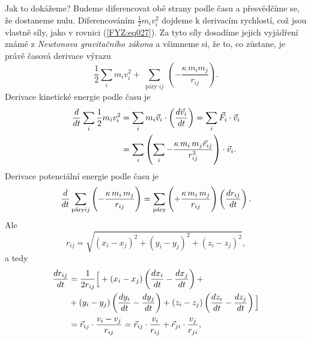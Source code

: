 {    Jak to dokážeme? Budeme diferencovat obě strany podle času a přesvědčíme se, že dostaneme nulu. 
    Diferencováním \(\frac{1}{2}m_iv_i^2\) dojdeme k derivacím rychlostí, což jsou vlastně síly, 
    jako v rovnici (\ref{FYZ:eq027}). Za tyto síly dosadíme jejich vyjádření známé z 
    \emph{Newtonova gravitačního zákona} a všimneme si, že to, co zůstane, je právě časová derivace 
    výrazu
    \begin{equation*}
      \frac{1}{2}\sum_im_iv_i^2 + 
      \sum_{\substack{\text{páry } ij}}\left(-\frac{\kappa\,m_im_j}{r_{ij}}\right).
    \end{equation*}
    Derivace kinetické energie podle času je
    \begin{align}
      \dfrac{d  }{d t}\sum_{\substack{i}}\frac{1}{2}m_iv_i^2 &=
                \sum_{\substack{i}}m_i\vec{v}_i\cdot\left(\dfrac{d \vec{v}_i}{d t}\right)  
              = \sum_{\substack{i}}\vec{F}_i\cdot\vec{v}_i                           \nonumber \\
             &= \sum_{\substack{i}}\left(\sum_{\substack{i}}
               -\frac{\kappa\,m_i\,m_j\vec{r}_{ij}}{r_{ij}^3}\right)\cdot\vec{v}_i.  
                \label{FYZ:eq040}
    \end{align}
    Derivace potenciální energie podle času je
    \begin{equation}\label{FYZ:eq041}
      \dfrac{d  }{d t}\sum_{\substack{\text{páry}} ij}\left(-\frac{\kappa\,m_i\,m_j}{r_{ij}}\right) =
                \sum_{\substack{\text{páry}}}\left(+\frac{\kappa\,m_i\,m_j}{r_{ij}}\right)
                     \left(\dfrac{d r_{ij}}{d t}\right).
    \end{equation}
    Ale
    \begin{equation}\label{FYZ:eq042}
      r_{ij} = \sqrt{(x_i - x_j)^2 + (y_i - y_j)^2 + (z_i - z_j)^2},
    \end{equation}
    a tedy
    \begin{align}
      \dfrac{d r_{ij}}{d t} 
        &= \frac{1}{2r_{ij}}
        \Big[\Big.
         + (x_i - x_j)\left(\dfrac{d x_i}{d t} - \dfrac{d x_j}{d t}\right) +  \nonumber \\ 
        &+ (y_i - y_j)\left(\dfrac{d y_i}{d t} - \dfrac{d y_j}{d t}\right) 
         + (z_i - z_j)\left(\dfrac{d z_i}{d t} - \dfrac{d z_j}{d t}\right)    
        \Big.\Big]                                                \nonumber  \\
        &= \vec{r}_{ij}\cdot\frac{v_i - v_j}{r_{ij}} 
         = \vec{r}_{ij}\cdot\frac{v_i}{r_{ij}} + \vec{r}_{ji}\cdot\frac{v_j}{r_{ji}},
    \end{align}
}
